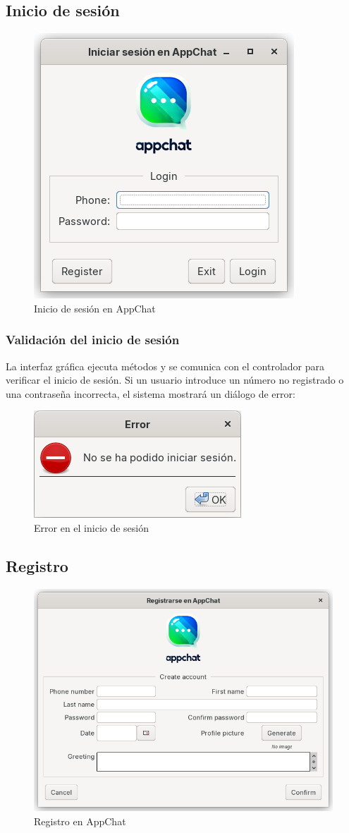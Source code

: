 \documentclass[11pt]{article}
\begin{document}
\subsection{Inicio de sesión}

\begin{figure}[H]
	\centering
	\includegraphics[width=0.4\linewidth]{figures/login}
	\caption{Inicio de sesión en AppChat}
	\label{fig:login}
\end{figure}

\subsubsection{Validación del inicio de sesión}

La interfaz gráfica ejecuta métodos y se comunica con el controlador para verificar el inicio de sesión. Si un usuario introduce un número no registrado o una contraseña incorrecta, el sistema mostrará un diálogo de error:

\begin{figure}[H]
	\centering
	\includegraphics[width=0.4\linewidth]{figures/error-login.png}
	\caption{Error en el inicio de sesión}
	\label{fig:error-login}
\end{figure}

\subsection{Registro}

\begin{figure}[H]
	\centering
	\includegraphics[width=0.6\linewidth]{figures/register}
	\caption{Registro en AppChat}
	\label{fig:register}
\end{figure}
\end{document}
